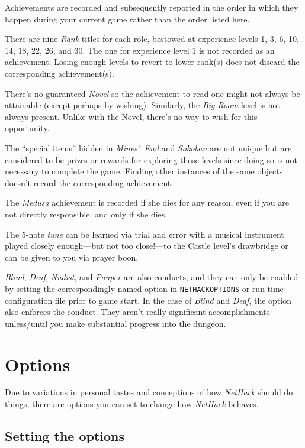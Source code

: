 \documentclass[titlepage]{article}
\begin{document}
Achievements are recorded and subsequently reported in the order in which
they happen during your current game rather than the order listed here.

There are nine \textit{Rank} titles for each role, bestowed at experience
levels 1, 3, 6, 10, 14, 18, 22, 26, and 30.
The one for experience level 1 is not recorded as an achievement.
Losing enough levels to revert to lower rank(s) does not discard the
corresponding achievement(s).

There's no guaranteed \textit{Novel} so the achievement to read one might
not always be attainable (except perhaps by wishing).
Similarly, the \textit{Big Room} level is not always present.
Unlike with the Novel, there's no way to wish for this opportunity.

The ``special items'' hidden in \textit{Mines'~End} and \textit{Sokoban}
are not unique but are considered to be prizes or rewards
for exploring those levels since doing so is not necessary to complete
the game.
Finding other instances of the same objects doesn't record the
corresponding achievement.

The \textit{Medusa} achievement is recorded if she dies for any reason,
even if you are not directly responsible, and only if she dies.

The 5-note \textit{tune} can be learned via trial and error with a musical
instrument played closely
enough---but not too close!---to
the Castle level's drawbridge or can be given to you via prayer boon.

\textit{Blind}, \textit{Deaf}, \textit{Nudist}, and \textit{Pauper} are also conducts, and they can only be
enabled by setting the correspondingly named option in \texttt{NETHACKOPTIONS}
or run-time configuration file prior to game start.
In the case of \textit{Blind} and \textit{Deaf}, the option also enforces the
conduct.
They aren't really significant accomplishments unless/until you make
substantial progress into the dungeon.

\section{Options}

Due to variations in personal tastes and conceptions of how \textit{NetHack}
should do things, there are options you can set to change how \textit{NetHack}
behaves.

\subsection*{Setting the options}
\end{document}
